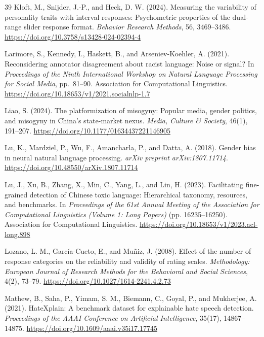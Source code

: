 \documentclass[a4paper,fleqn,review,longmktitle]{cas-sc}
\begin{document}
\begin{thebibliography}{39}
Kloft, M., Snijder, J.-P., and Heck, D. W. (2024).
Measuring the variability of personality traits with interval responses: Psychometric properties of the dual-range slider response format.
\emph{Behavior Research Methods}, 56, 3469--3486.
\url{https://doi.org/10.3758/s13428-024-02394-4}

Larimore, S., Kennedy, I., Haskett, B., and Arseniev-Koehler, A. (2021).
Reconsidering annotator disagreement about racist language: Noise or signal?
In \emph{Proceedings of the Ninth International Workshop on Natural Language Processing for Social Media}, pp.~81--90. Association for Computational Linguistics.
\url{https://doi.org/10.18653/v1/2021.socialnlp-1.7}

Liao, S. (2024).
The platformization of misogyny: Popular media, gender politics, and misogyny in China's state-market nexus.
\emph{Media, Culture \& Society}, 46(1), 191--207.
\url{https://doi.org/10.1177/01634437221146905}

Lu, K., Mardziel, P., Wu, F., Amancharla, P., and Datta, A. (2018).
Gender bias in neural natural language processing.
\emph{arXiv preprint arXiv:1807.11714}.
\url{https://doi.org/10.48550/arXiv.1807.11714}

Lu, J., Xu, B., Zhang, X., Min, C., Yang, L., and Lin, H. (2023).
Facilitating fine-grained detection of Chinese toxic language: Hierarchical taxonomy, resources, and benchmarks.
In \emph{Proceedings of the 61st Annual Meeting of the Association for Computational Linguistics (Volume 1: Long Papers)} (pp. 16235--16250).
Association for Computational Linguistics.
\url{https://doi.org/10.18653/v1/2023.acl-long.898}

Lozano, L. M., Garc\'ia-Cueto, E., and Mu\~niz, J. (2008).
Effect of the number of response categories on the reliability and validity of rating scales.
\emph{Methodology: European Journal of Research Methods for the Behavioral and Social Sciences}, 4(2), 73--79.
\url{https://doi.org/10.1027/1614-2241.4.2.73}

Mathew, B., Saha, P., Yimam, S. M., Biemann, C., Goyal, P., and Mukherjee, A. (2021).
HateXplain: A benchmark dataset for explainable hate speech detection.
\emph{Proceedings of the AAAI Conference on Artificial Intelligence}, 35(17), 14867--14875.
\url{https://doi.org/10.1609/aaai.v35i17.17745}


\end{thebibliography}
\end{document}
